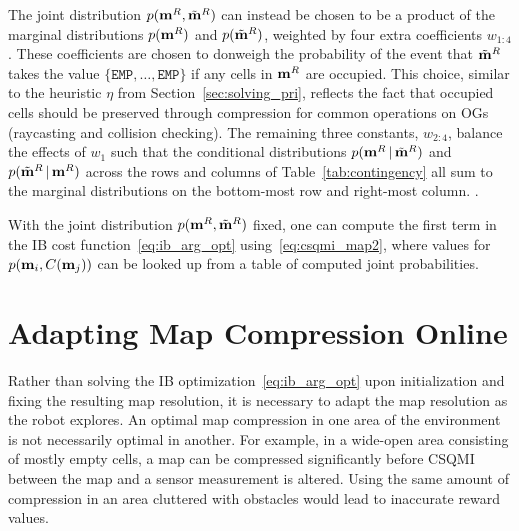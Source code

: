 The joint distribution $p(\mathbf{m}^{R},\tilde{\mathbf{m}}^{R})$ can instead be
chosen to be a product of the marginal distributions $p(\mathbf{m}^{R})$ and $p(\tilde{\mathbf{m}}^R)$, weighted
by four extra coefficients $w_{1:4}$. These coefficients are chosen to donweigh
the probability of the event that $\tilde{\mathbf{m}}^{R}$ takes the value
$\{\texttt{EMP},\dots,\texttt{EMP}\}$ if any cells in $\mathbf{m}^{R}$ are
occupied. This choice, similar to the heuristic $\eta$ from
Section~\ref{sec:solving_pri}, reflects the fact that occupied cells should be
preserved through compression for common operations on OGs (raycasting
and collision checking). The remaining three constants, $w_{2:4}$, balance the effects
of $w_{1}$ such that the conditional distributions $p(\mathbf{m}^{R} \, \vert \,
\tilde{\mathbf{m}}^{R})$ and $p(\tilde{\mathbf{m}}^{R} \, \vert \, \mathbf{m}^{R})$ across the rows
and columns of Table~\ref{tab:contingency} all sum to the marginal
distributions on the bottom-most row and right-most column. .

With the joint distribution $p(\mathbf{m}^{R}, \tilde{\mathbf{m}}^{R})$ fixed, one can
compute the first term in the IB cost function~\eqref{eq:ib_arg_opt}
using~\eqref{eq:csqmi_map2}, where values for $p(\mathbf{m}_{i},C(\mathbf{m}_{j}))$
can be looked up from a table of computed joint probabilities.
%

\section{Adapting Map Compression Online}
\label{sec:adapting}

Rather than solving the IB optimization~\eqref{eq:ib_arg_opt} upon initialization
and fixing the resulting map resolution, it is necessary to adapt the map
resolution as the robot explores.
An optimal map compression in one area of the
environment is not necessarily optimal in another. For example, in a wide-open
area consisting of mostly empty cells, a map can be compressed
significantly before CSQMI between the map and a sensor measurement is altered.
Using the same amount of compression in an area cluttered with obstacles would
lead to inaccurate reward values.

